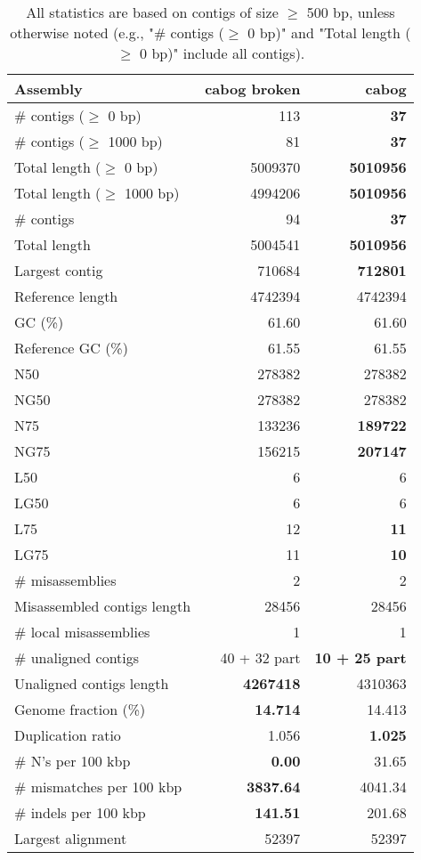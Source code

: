 \documentclass[12pt,a4paper]{article}
\begin{document}
\begin{table}[ht]
\begin{center}
\caption{All statistics are based on contigs of size $\geq$ 500 bp, unless otherwise noted (e.g., "\# contigs ($\geq$ 0 bp)" and "Total length ($\geq$ 0 bp)" include all contigs).}
\begin{tabular}{|l*{2}{|r}|}
\hline
Assembly & cabog broken & cabog \\ \hline
\# contigs ($\geq$ 0 bp) & 113 & {\bf 37} \\ \hline
\# contigs ($\geq$ 1000 bp) & 81 & {\bf 37} \\ \hline
Total length ($\geq$ 0 bp) & 5009370 & {\bf 5010956} \\ \hline
Total length ($\geq$ 1000 bp) & 4994206 & {\bf 5010956} \\ \hline
\# contigs & 94 & {\bf 37} \\ \hline
Total length & 5004541 & {\bf 5010956} \\ \hline
Largest contig & 710684 & {\bf 712801} \\ \hline
Reference length & 4742394 & 4742394 \\ \hline
GC (\%) & 61.60 & 61.60 \\ \hline
Reference GC (\%) & 61.55 & 61.55 \\ \hline
N50 & 278382 & 278382 \\ \hline
NG50 & 278382 & 278382 \\ \hline
N75 & 133236 & {\bf 189722} \\ \hline
NG75 & 156215 & {\bf 207147} \\ \hline
L50 & 6 & 6 \\ \hline
LG50 & 6 & 6 \\ \hline
L75 & 12 & {\bf 11} \\ \hline
LG75 & 11 & {\bf 10} \\ \hline
\# misassemblies & 2 & 2 \\ \hline
Misassembled contigs length & 28456 & 28456 \\ \hline
\# local misassemblies & 1 & 1 \\ \hline
\# unaligned contigs & 40 + 32 part & {\bf 10 + 25 part} \\ \hline
Unaligned contigs length & {\bf 4267418} & 4310363 \\ \hline
Genome fraction (\%) & {\bf 14.714} & 14.413 \\ \hline
Duplication ratio & 1.056 & {\bf 1.025} \\ \hline
\# N's per 100 kbp & {\bf 0.00} & 31.65 \\ \hline
\# mismatches per 100 kbp & {\bf 3837.64} & 4041.34 \\ \hline
\# indels per 100 kbp & {\bf 141.51} & 201.68 \\ \hline
Largest alignment & 52397 & 52397 \\ \hline
\end{tabular}
\end{center}
\end{table}
\end{document}

